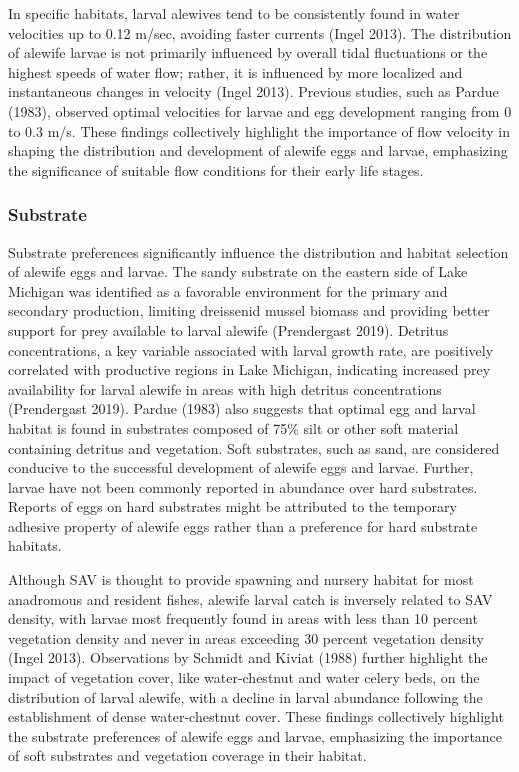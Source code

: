 \documentclass[
]{book}
\begin{document}
In specific habitats, larval alewives tend to be consistently found in water velocities up to 0.12 m/sec, avoiding faster currents (Ingel 2013). The distribution of alewife larvae is not primarily influenced by overall tidal fluctuations or the highest speeds of water flow; rather, it is influenced by more localized and instantaneous changes in velocity (Ingel 2013). Previous studies, such as Pardue (1983), observed optimal velocities for larvae and egg development ranging from 0 to 0.3 m/s. These findings collectively highlight the importance of flow velocity in shaping the distribution and development of alewife eggs and larvae, emphasizing the significance of suitable flow conditions for their early life stages.

\hypertarget{substrate-2}{%
\subsubsection{Substrate}\label{substrate-2}}

Substrate preferences significantly influence the distribution and habitat selection of alewife eggs and larvae. The sandy substrate on the eastern side of Lake Michigan was identified as a favorable environment for the primary and secondary production, limiting dreissenid mussel biomass and providing better support for prey available to larval alewife (Prendergast 2019). Detritus concentrations, a key variable associated with larval growth rate, are positively correlated with productive regions in Lake Michigan, indicating increased prey availability for larval alewife in areas with high detritus concentrations (Prendergast 2019). Pardue (1983) also suggests that optimal egg and larval habitat is found in substrates composed of 75\% silt or other soft material containing detritus and vegetation. Soft substrates, such as sand, are considered conducive to the successful development of alewife eggs and larvae. Further, larvae have not been commonly reported in abundance over hard substrates. Reports of eggs on hard substrates might be attributed to the temporary adhesive property of alewife eggs rather than a preference for hard substrate habitats.

Although SAV is thought to provide spawning and nursery habitat for most anadromous and resident fishes, alewife larval catch is inversely related to SAV density, with larvae most frequently found in areas with less than 10 percent vegetation density and never in areas exceeding 30 percent vegetation density (Ingel 2013). Observations by Schmidt and Kiviat (1988) further highlight the impact of vegetation cover, like water-chestnut and water celery beds, on the distribution of larval alewife, with a decline in larval abundance following the establishment of dense water-chestnut cover. These findings collectively highlight the substrate preferences of alewife eggs and larvae, emphasizing the importance of soft substrates and vegetation coverage in their habitat.
\end{document}

